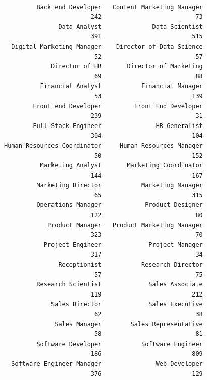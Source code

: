 \documentclass[
  letterpaper,
  DIV=11,
  numbers=noendperiod]{scrartcl}
\newenvironment{Shaded}{\begin{snugshade}}{\end{snugshade}}
\newcommand{\FunctionTok}[1]{\textcolor[rgb]{0.28,0.35,0.67}{#1}}
\newcommand{\NormalTok}[1]{\textcolor[rgb]{0.00,0.23,0.31}{#1}}
\newcommand{\OtherTok}[1]{\textcolor[rgb]{0.00,0.23,0.31}{#1}}
\newcommand{\SpecialCharTok}[1]{\textcolor[rgb]{0.37,0.37,0.37}{#1}}
\begin{document}
\begin{Shaded}
\end{Shaded}

\begin{verbatim}

         Back end Developer   Content Marketing Manager 
                        242                          73 
               Data Analyst              Data Scientist 
                        391                         515 
  Digital Marketing Manager    Director of Data Science 
                         52                          57 
             Director of HR       Director of Marketing 
                         69                          88 
          Financial Analyst           Financial Manager 
                         53                         139 
        Front end Developer         Front End Developer 
                        239                          31 
        Full Stack Engineer               HR Generalist 
                        304                         104 
Human Resources Coordinator     Human Resources Manager 
                         50                         152 
          Marketing Analyst       Marketing Coordinator 
                        144                         167 
         Marketing Director           Marketing Manager 
                         65                         315 
         Operations Manager            Product Designer 
                        122                          80 
            Product Manager   Product Marketing Manager 
                        323                          70 
           Project Engineer             Project Manager 
                        317                          34 
               Receptionist           Research Director 
                         57                          75 
         Research Scientist             Sales Associate 
                        119                         212 
             Sales Director             Sales Executive 
                         62                          38 
              Sales Manager        Sales Representative 
                         58                          81 
         Software Developer           Software Engineer 
                        186                         809 
  Software Engineer Manager               Web Developer 
                        376                         129 
\end{verbatim}
\end{document}
